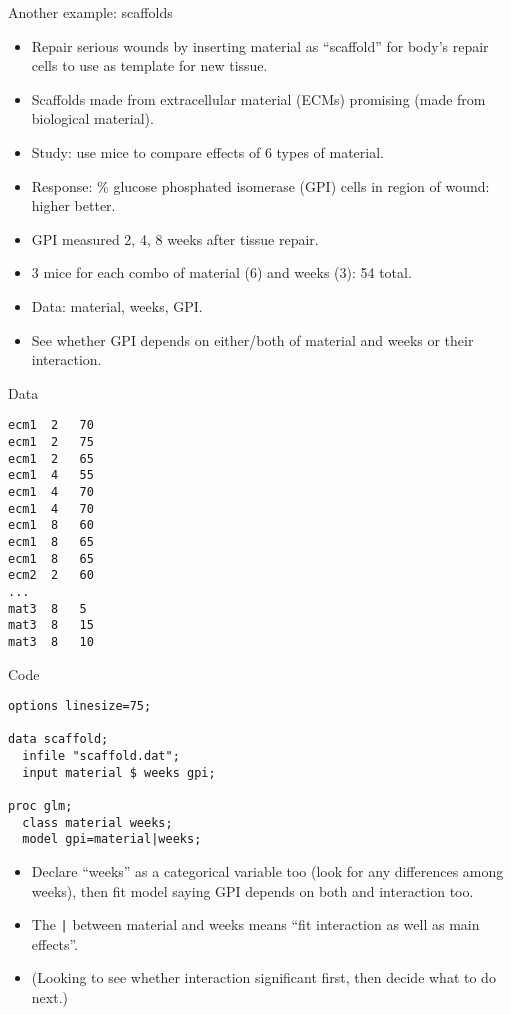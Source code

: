 \documentclass[pdf]{prosper}
\begin{document}
\begin{slide}{Another example: scaffolds}

  \begin{itemize}
  \item Repair serious wounds by inserting material as ``scaffold'' for body's repair cells to use as template for new tissue.
  \item Scaffolds made from extracellular material (ECMs) promising (made from biological material).
  \item Study: use mice to compare effects of 6 types of material.
  \item Response: \% glucose phosphated isomerase (GPI) cells in region of wound: higher better.
  \item GPI measured 2, 4, 8 weeks after tissue repair.
  \item 3 mice for each combo of material (6) and weeks (3): 54 total.
  \item Data: material, weeks, GPI.
  \item See whether GPI depends on either/both of material and weeks or their interaction.
  \end{itemize}

  
\end{slide}

\begin{slide}{Data }

\begin{verbatim}
ecm1  2   70
ecm1  2   75
ecm1  2   65
ecm1  4   55
ecm1  4   70
ecm1  4   70
ecm1  8   60
ecm1  8   65
ecm1  8   65
ecm2  2   60
...
mat3  8   5
mat3  8   15
mat3  8   10

\end{verbatim}
  
\end{slide}

\begin{slide}{Code}

\begin{verbatim}
options linesize=75;

data scaffold;
  infile "scaffold.dat";
  input material $ weeks gpi;

proc glm;
  class material weeks;
  model gpi=material|weeks;
\end{verbatim}

  \begin{itemize}
  \item 
Declare ``weeks'' as a categorical variable too (look for any differences among weeks), then fit model saying GPI depends on both and interaction too.
\item The \verb-|- between material and weeks means ``fit interaction as well as main effects''.

\item (Looking to see whether interaction significant first, then decide what to do next.)
  \end{itemize}
\end{slide}
\end{document}
